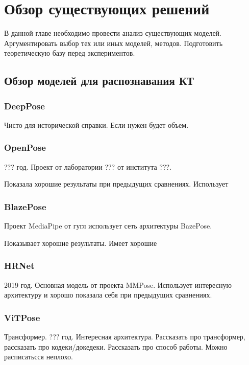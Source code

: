 \section{Обзор существующих решений}
\label{sec:Chapter4} 

В данной главе необходимо провести анализ существующих моделей. Аргументировать выбор тех или иных моделей, методов. Подготовить теоретическую базу перед экспериментов.

\subsection{Обзор моделей для распознавания КТ}
\label{sec:Chapter4_PE}

\subsubsection{DeepPose}

Чисто для исторической справки. Если нужен будет объем.

\subsubsection{OpenPose}

??? год. Проект от лаборатории ??? от института ???. 

Показала хорошие результаты при предыдущих сравнениях. Использует

\subsubsection{BlazePose}

Проект MediaPipe от гугл использует сеть архитектуры BazePose.

Показывает хорошие результаты. Имеет хорошие

\subsubsection{HRNet}

2019 год. Основная модель от проекта MMPose. Использует интересную архитектуру и хорошо показала себя при предыдущих сравнениях.

\subsubsection{ViTPose}

Трансформер. ??? год. Интересная архитектура. Рассказать про трансформер, рассказать про кодеки/докедеки. Рассказать про способ работы. Можно расписатьсся неплохо.

